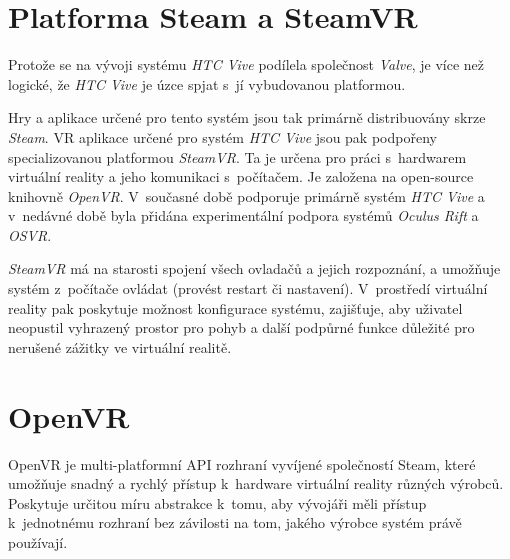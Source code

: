 \newpage

\section{Platforma Steam a SteamVR}\label{platforma-steam-a-steamvr}

Protože se na vývoji systému \emph{HTC Vive} podílela společnost
\emph{Valve}, je více než logické, že \emph{HTC Vive} je úzce spjat
s~jí vybudovanou platformou.

Hry a aplikace určené pro tento systém jsou tak primárně distribuovány skrze \emph{Steam}. VR aplikace určené pro systém \emph{HTC Vive}
jsou pak podpořeny specializovanou platformou \emph{SteamVR}. Ta je
určena pro práci s~hardwarem virtuální reality a jeho komunikaci
s~počítačem. Je založena na open-source knihovně \emph{OpenVR}. V~současné
době podporuje primárně systém \emph{HTC Vive} a v~nedávné době byla
přidána experimentální podpora systémů \emph{Oculus Rift} a \emph{OSVR}. \autocite{steamvrsupports}

\emph{SteamVR} má na starosti spojení všech ovladačů a jejich
rozpoznání, a umožňuje systém z~počítače ovládat (provést restart či
nastavení). V~prostředí virtuální reality pak poskytuje možnost
konfigurace systému, zajišťuje, aby uživatel neopustil vyhrazený prostor
pro pohyb a další podpůrné funkce důležité pro nerušené zážitky ve
virtuální realitě.

\section{OpenVR}\label{openvr}

OpenVR je multi-platformní API rozhraní vyvíjené společností Steam,
které umožňuje snadný a rychlý přístup k~hardware virtuální reality
různých výrobců. Poskytuje určitou míru abstrakce k~tomu, aby vývojáři
měli přístup k~jednotnému rozhraní bez závilosti na tom, jakého výrobce
systém právě používají.
